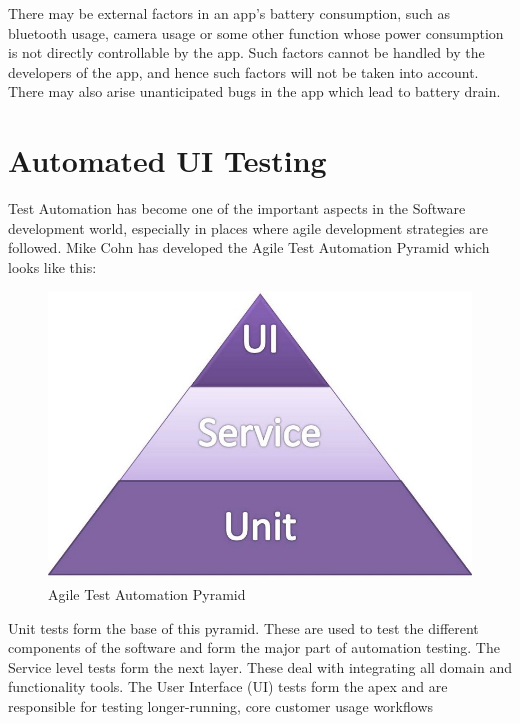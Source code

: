 There may be external factors in an app’s battery consumption, such as bluetooth usage, camera usage or some other function whose power consumption is not directly controllable by the app. Such factors cannot be handled by the developers of the app, and hence such factors will not be taken into account. There may also arise unanticipated bugs in the app which lead to battery drain. 

\section{Automated UI Testing}
Test Automation has become one of the important aspects in the Software development world, especially in places where agile development strategies are followed. Mike Cohn has developed the Agile Test Automation Pyramid\cite{pyramid} which looks like this:
\begin{figure}[!h]
 	\begin{center}
		\includegraphics[scale=0.5]{pyramid}
		\caption{Agile Test Automation Pyramid}
	\end{center}
\end{figure}

Unit tests form the base of this pyramid. These are used to test the different components of the software and form the major part of automation testing. The Service level tests form the next layer. These deal with integrating all domain and functionality tools. The User Interface (UI) tests form the apex and are responsible for testing longer-running, core customer usage workflows

